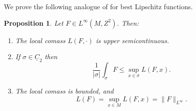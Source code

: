 \documentclass[reqno,11pt]{amsart}
\newcommand*\dif{\mathop{}\!\mathrm{d}}
\newcommand{\Chain}{\underline C}
\newtheorem{proposition}[theorem]{Proposition}
\theoremstyle{definition}
\numberwithin{equation}{section}
\begin{document}
We prove the following analogue of \cite[Lemma 4.2]{Crandall2008} for best Lipschitz functions.

\begin{proposition}\label{crandall}
Let $F \in L^\infty(M, Z^2)$. Then:
\begin{enumerate}
\item The local comass $L(F, \cdot)$ is upper semicontinuous. \label{crandall usc}
\item If $\sigma \in \Chain_2$ then \label{crandall best curl is ABC}
$$\frac{1}{|\sigma|} \int_\sigma F \leq \sup_{x \in \sigma} L(F, x).$$
\item The local comass is bounded, and \label{crandall linfinity}
$$L(F) = \sup_{x \in M} L(F, x) = \|F\|_{L^\infty}.$$
\end{enumerate}
\end{proposition}
\end{document}
